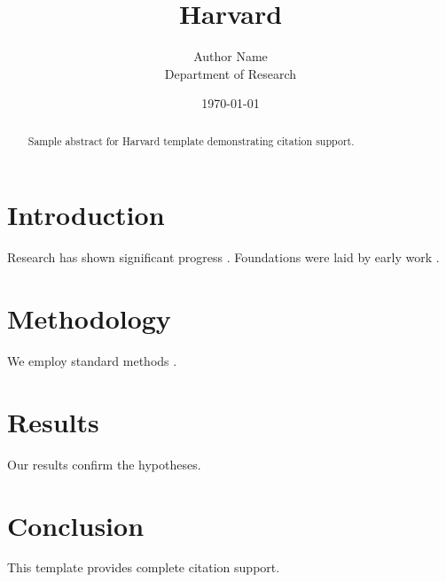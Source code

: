 \documentclass{thesis_harvard}
\title{Harvard}
\author{Author Name \\ \small Department of Research}
\date{\today}
\begin{document}
\maketitle

\begin{abstract}
Sample abstract for Harvard template demonstrating citation support.
\end{abstract}

\section{Introduction}
Research has shown significant progress \citep{einstein1905}. Foundations were laid by early work \citep{turing1950}.

\section{Methodology}
We employ standard methods \citep{knuth1984}.

\section{Results}
Our results confirm the hypotheses.

\section{Conclusion}
This template provides complete citation support.



\end{document}
